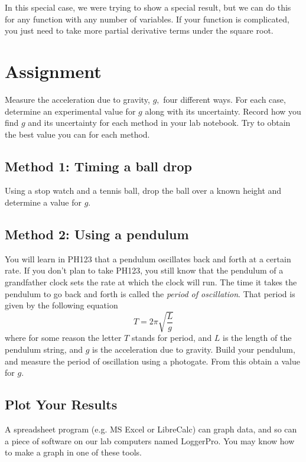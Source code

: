 \documentclass{book}
\begin{document}
In this special case, we were trying to show a special result, but we can do
this for any function with any number of variables. If your function is
complicated, you just need to take more partial derivative terms under the
square root.

\pagebreak

\section{Assignment}

Measure the acceleration due to gravity, $g,$ four different ways. For each
case, determine an experimental value for $g$ along with its uncertainty.
Record how you find $g$ and its uncertainty for each method in your lab
notebook. Try to obtain the best value you can for each method.

\subsection{Method 1: Timing a ball drop}

Using a stop watch and a tennis ball, drop the ball over a known height and
determine a value for $g.$

\subsection{Method 2: Using a pendulum}

You will learn in PH123 that a pendulum oscillates back and forth at a certain
rate. If you don't plan to take PH123, you still know that the pendulum of a
grandfather clock sets the rate at which the clock will run. The time it takes
the pendulum to go back and forth is called the \emph{period of oscillation}.
That period is given by the following equation
\[
T=2\pi\sqrt{\frac{L}{g}}
\]
where for some reason the letter $T$ stands for period, and $L$ is the length
of the pendulum string, and $g$ is the acceleration due to gravity. Build your
pendulum, and measure the period of oscillation using a photogate. From this
obtain a value for $g.$

\subsection{Plot Your Results}

A spreadsheet program (e.g. MS Excel or LibreCalc) can graph data, and so can
a piece of software on our lab computers named LoggerPro. You may know how to
make a graph in one of these tools.
\end{document}
